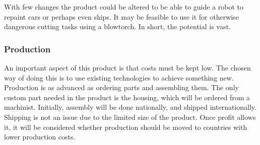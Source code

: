 With few changes the product could be altered to be able to guide a robot to repaint cars or perhaps even ships. It may be feasible to use it for otherwise dangerous cutting tasks using a blowtorch. In short, the potential is vast.

\subsubsection{Production}
An important aspect of this product is that costs must be kept low. The chosen way of doing this is to use existing technologies to achieve something new. Production is as advanced as ordering parts and assembling them. The only custom part needed in the product is the housing, which will be ordered from a machinist. Initially, assembly will be done nationally, and shipped internationally. Shipping is not an issue due to the limited size of the product. Once profit allows it, it will be considered whether production should be moved to countries with lower production costs.
